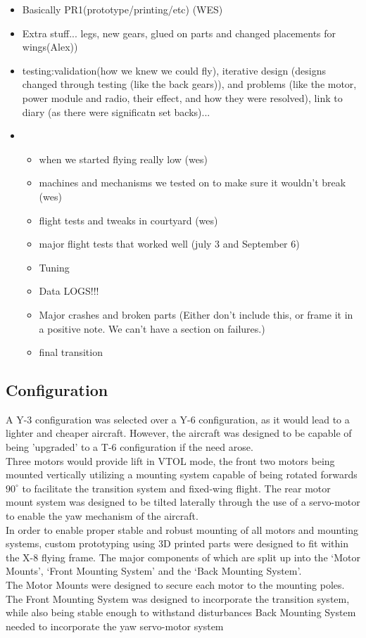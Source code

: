 \color{red}
\begin{itemize}
\item Basically PR1(prototype/printing/etc) (WES)
\item Extra stuff... legs, new gears, glued on parts and changed placements for wings(Alex))
\item testing:validation(how we knew we could fly), iterative design (designs changed through testing (like the back gears)), and problems (like the motor, power module and radio, their effect, and how they were resolved), link to diary (as there were significatn set backs)... 
\item \begin{itemize}
	\item when we started flying really low (wes) 
	\item machines and mechanisms we tested on to make sure it wouldn’t break (wes) 
	\item flight tests and tweaks in courtyard (wes) 
	\item major flight tests that worked well (july 3 and September 6) 
	\item Tuning 
	\item Data LOGS!!! 
	\item Major crashes and broken parts (Either don't include this, or frame it in a positive note. We can't have a section on failures.)
	\item final transition
\end{itemize}
\end{itemize}
\color{black}

\subsection{Configuration}
A Y-3 configuration was selected over a Y-6 configuration, as it would lead to a lighter and cheaper aircraft. However, the aircraft was designed to be capable of being 'upgraded' to a T-6 configuration if the need arose.\\
Three motors would provide lift in VTOL mode, the front two motors being mounted vertically utilizing a mounting system capable of being rotated forwards $90^{\circ}$ to facilitate the transition system and fixed-wing flight. The rear motor mount system was designed to be tilted laterally through the use of a servo-motor to enable the yaw mechanism of the aircraft.\\
In order to enable proper stable and robust mounting of all motors and mounting systems, custom prototyping using 3D printed parts were designed to fit within the X-8 flying frame. The major components of which are split up into the `Motor Mounts', `Front  Mounting System' and the `Back Mounting System'.\\
The Motor Mounts were designed to secure each motor to the mounting poles. 
The Front Mounting System was designed to incorporate the transition system, while also being stable enough to withstand disturbances
Back Mounting System needed to incorporate the yaw servo-motor system

